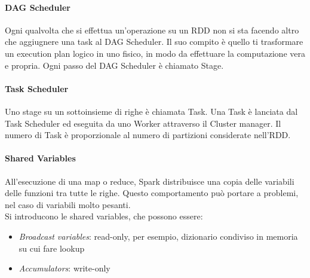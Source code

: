 \documentclass[a4paper]{article}
\begin{document}
\paragraph{DAG Scheduler}
Ogni qualvolta che si effettua un'operazione su un RDD non si sta facendo altro che 
aggiugnere una task al DAG Scheduler. Il suo compito è quello ti trasformare un 
execution plan logico in uno fisico, in modo da effettuare la computazione vera e propria.
Ogni passo del DAG Scheduler è chiamato Stage.

\paragraph{Task Scheduler}
Uno stage su un sottoinsieme di righe è chiamata Task.
Una Task è lanciata dal Task Scheduler ed eseguita da uno Worker 
attraverso il Cluster manager. Il numero 
di Task è proporzionale al numero di partizioni considerate nell'RDD.

\paragraph{Shared Variables}
All'esecuzione di una map o reduce, Spark distribuisce una copia delle 
variabili delle funzioni tra tutte le righe. Questo comportamento 
può portare a problemi, nel caso di variabili molto pesanti.\\
Si introducono le shared variables, che possono essere:
\begin{itemize}
    \item \emph{Broadcast variables}: read-only, per esempio, dizionario 
    condiviso in memoria su cui fare lookup
    \item \emph{Accumulators}: write-only
\end{itemize}
\end{document}
